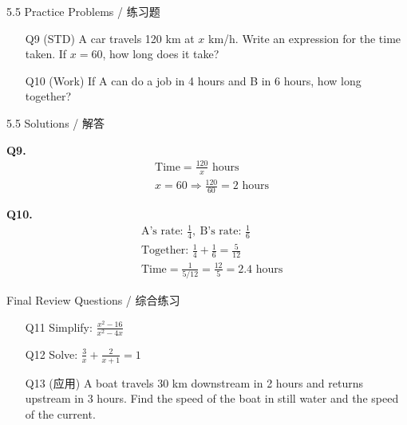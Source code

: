 \documentclass[aspectratio=169]{beamer}
\begin{document}
\begin{frame}{5.5 Practice Problems / 练习题}
    \begin{tcolorbox}[colback=lightgray,colframe=accent,title=Practice]
        \footnotesize
        \begin{enumerate}
            \item[Q9] (STD) A car travels 120 km at $x$ km/h. Write an expression for the time taken. If $x=60$, how long does it take?
            \item[Q10] (Work) If A can do a job in 4 hours and B in 6 hours, how long together?
        \end{enumerate}
    \end{tcolorbox}
\end{frame}

\begin{frame}{5.5 Solutions / 解答}
    \begin{tcolorbox}[colback=lightgray,colframe=primary,title=Solutions]
        \footnotesize
        \textbf{Q9.}
        \begin{align*}
            &\text{Time} = \frac{120}{x} \text{ hours} \\
            &x=60 \Rightarrow \frac{120}{60} = 2 \text{ hours}
        \end{align*}
        
        \textbf{Q10.}
        \begin{align*}
            &\text{A's rate: } \frac{1}{4},\ \text{B's rate: } \frac{1}{6} \\
            &\text{Together: } \frac{1}{4}+\frac{1}{6}=\frac{5}{12} \\
            &\text{Time} = \frac{1}{5/12} = \frac{12}{5} = 2.4 \text{ hours}
        \end{align*}
    \end{tcolorbox}
\end{frame}

\begin{frame}{Final Review Questions / 综合练习}
    \begin{tcolorbox}[colback=lightgray,colframe=primary,title=Comprehensive Review]
        \footnotesize
        \begin{enumerate}
            \item[Q11] Simplify: $\frac{x^2-16}{x^2-4x}$
            \item[Q12] Solve: $\frac{3}{x} + \frac{2}{x+1} = 1$
            \item[Q13] (应用) A boat travels 30 km downstream in 2 hours and returns upstream in 3 hours. Find the speed of the boat in still water and the speed of the current.
        \end{enumerate}
    \end{tcolorbox}
\end{frame}
\end{document}
